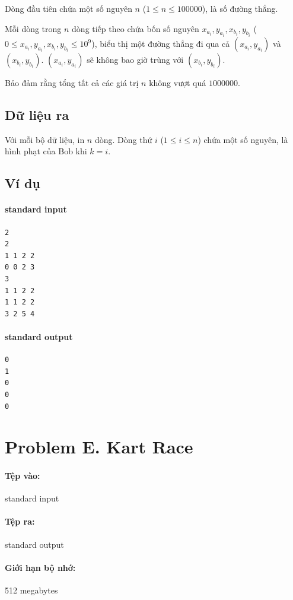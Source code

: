 \documentclass[11pt]{article}
\begin{document}
Dòng đầu tiên chứa một số nguyên \(n\) (\(1\le n\le 100000\)), là số đường
thẳng.

Mỗi dòng trong \(n\) dòng tiếp theo chứa bốn số nguyên
\(x_{a_i},y_{a_i},x_{b_i},y_{b_i}\)
(\(0\le x_{a_i},y_{a_i},x_{b_i},y_{b_i}\le 10^9\)), biểu thị một đường
thẳng đi qua cả \((x_{a_i},y_{a_i})\) và \((x_{b_i},y_{b_i})\).
\((x_{a_i},y_{a_i})\) sẽ không bao giờ trùng với \((x_{b_i},y_{b_i})\).

Bảo đảm rằng tổng tất cả các giá trị \(n\) không vượt quá \(1000000\).

\subsection*{Dữ liệu ra}

Với mỗi bộ dữ liệu, in \(n\) dòng. Dòng thứ \(i\) (\(1\le i\le n\)) chứa một
số nguyên, là hình phạt của Bob khi \(k=i\).

\subsection*{Ví dụ}

\paragraph{standard input}
\begin{verbatim}
2
2
1 1 2 2
0 0 2 3
3
1 1 2 2
1 1 2 2
3 2 5 4
\end{verbatim}

\paragraph{standard output}
\begin{verbatim}
0
1
0
0
0
\end{verbatim}

\section{Problem E. Kart Race}

\paragraph{Tệp vào:} standard input
\paragraph{Tệp ra:} standard output
\paragraph{Giới hạn bộ nhớ:} 512 megabytes
\end{document}
